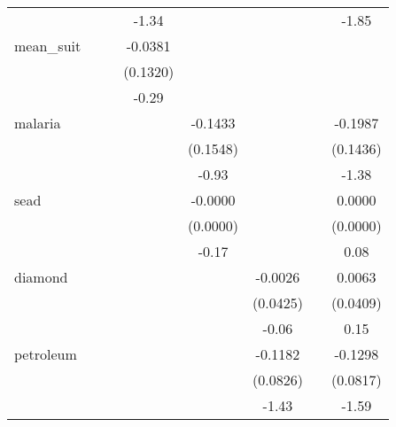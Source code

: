 {\begin{tabular}{l*{7}{c}}
            &               &               &       -1.34   &               &               &               &       -1.85   \\
mean\_suit   &               &               &     -0.0381   &               &               &               &               \\
            &               &               &    (0.1320)   &               &               &               &               \\
            &               &               &       -0.29   &               &               &               &               \\
malaria     &               &               &               &     -0.1433   &               &               &     -0.1987   \\
            &               &               &               &    (0.1548)   &               &               &    (0.1436)   \\
            &               &               &               &       -0.93   &               &               &       -1.38   \\
sead        &               &               &               &     -0.0000   &               &               &      0.0000   \\
            &               &               &               &    (0.0000)   &               &               &    (0.0000)   \\
            &               &               &               &       -0.17   &               &               &        0.08   \\
diamond     &               &               &               &               &     -0.0026   &               &      0.0063   \\
            &               &               &               &               &    (0.0425)   &               &    (0.0409)   \\
            &               &               &               &               &       -0.06   &               &        0.15   \\
petroleum   &               &               &               &               &     -0.1182   &               &     -0.1298   \\
            &               &               &               &               &    (0.0826)   &               &    (0.0817)   \\
            &               &               &               &               &       -1.43   &               &       -1.59   \\

\end{tabular}}

